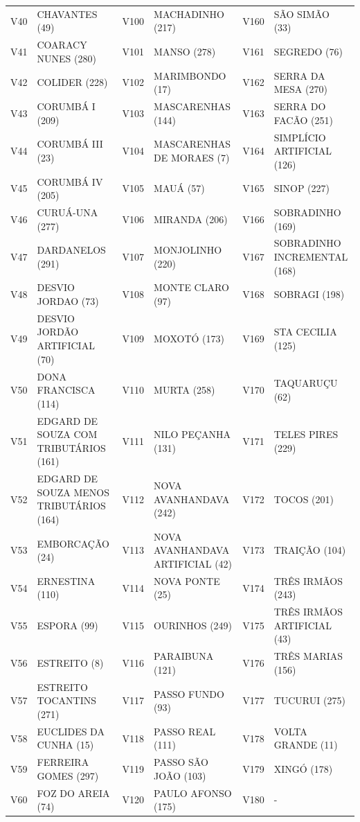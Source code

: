 \documentclass[12pt,oneside]{book}\usepackage[]{graphicx}\usepackage[]{color}
\newenvironment{knitrout}{}{} %
\theoremstyle{definition} %
\begin{document}
\begin{knitrout}
\begin{table}
{\begin{tabular}[t]{llllll}
V40 & CHAVANTES (49) & V100 & MACHADINHO (217) & V160 & SÃO SIMÃO (33)\\
\addlinespace
V41 & COARACY NUNES (280) & V101 & MANSO (278) & V161 & SEGREDO (76)\\
V42 & COLIDER (228) & V102 & MARIMBONDO (17) & V162 & SERRA DA MESA (270)\\
V43 & CORUMBÁ I (209) & V103 & MASCARENHAS (144) & V163 & SERRA DO FACÃO (251)\\
V44 & CORUMBÁ III (23) & V104 & MASCARENHAS DE MORAES (7) & V164 & SIMPLÍCIO ARTIFICIAL (126)\\
V45 & CORUMBÁ IV (205) & V105 & MAUÁ (57) & V165 & SINOP (227)\\
\addlinespace
V46 & CURUÁ-UNA (277) & V106 & MIRANDA (206) & V166 & SOBRADINHO (169)\\
V47 & DARDANELOS (291) & V107 & MONJOLINHO (220) & V167 & SOBRADINHO INCREMENTAL (168)\\
V48 & DESVIO JORDAO (73) & V108 & MONTE CLARO (97) & V168 & SOBRAGI (198)\\
V49 & DESVIO JORDÃO ARTIFICIAL (70) & V109 & MOXOTÓ (173) & V169 & STA CECILIA (125)\\
V50 & DONA FRANCISCA (114) & V110 & MURTA (258) & V170 & TAQUARUÇU (62)\\
\addlinespace
V51 & EDGARD DE SOUZA COM TRIBUTÁRIOS (161) & V111 & NILO PEÇANHA (131) & V171 & TELES PIRES (229)\\
V52 & EDGARD DE SOUZA MENOS TRIBUTÁRIOS (164) & V112 & NOVA AVANHANDAVA (242) & V172 & TOCOS (201)\\
V53 & EMBORCAÇÃO (24) & V113 & NOVA AVANHANDAVA ARTIFICIAL (42) & V173 & TRAIÇÃO (104)\\
V54 & ERNESTINA (110) & V114 & NOVA PONTE (25) & V174 & TRÊS IRMÃOS (243)\\
V55 & ESPORA (99) & V115 & OURINHOS (249) & V175 & TRÊS IRMÃOS ARTIFICIAL (43)\\
\addlinespace
V56 & ESTREITO (8) & V116 & PARAIBUNA (121) & V176 & TRÊS MARIAS (156)\\
V57 & ESTREITO TOCANTINS (271) & V117 & PASSO FUNDO (93) & V177 & TUCURUI (275)\\
V58 & EUCLIDES DA CUNHA (15) & V118 & PASSO REAL (111) & V178 & VOLTA GRANDE (11)\\
V59 & FERREIRA GOMES (297) & V119 & PASSO SÃO JOÃO (103) & V179 & XINGÓ (178)\\
V60 & FOZ DO AREIA (74) & V120 & PAULO AFONSO (175) & V180 & -\\
\bottomrule
\end{tabular}}
\end{table}


\end{knitrout}
\label{tab:estaciones}
\end{document}
